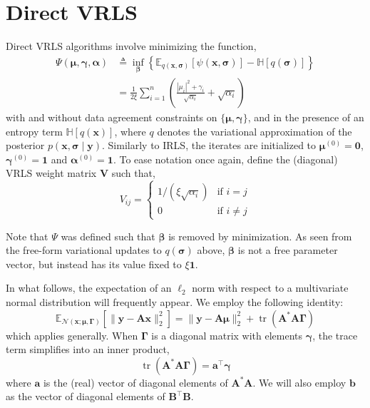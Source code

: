 \documentclass{article}
\newcommand{\m}[1]{\boldsymbol{#1}}
\newcommand{\E}[2]{\mathbb{E}_{#2}\left[ #1 \right]}
\newcommand{\entropy}[1]{\mathbb{H}\left[ #1 \right]}
\DeclareMathOperator{\trace}{tr}
\begin{document}
\section{Direct VRLS}
\label{s:vrls}
Direct VRLS algorithms involve minimizing the function,
\begin{equation}
\begin{aligned}
\Psi(\m{\mu}, \m{\gamma}, \m{\alpha}) &\triangleq
 \inf_{\m{\beta}} \left\{
  \E{\psi(\m{x}, \m{\sigma})}{q(\m{x}, \m{\sigma})} -
  \entropy{q(\m{\sigma})}
 \right\}
\\ &=
 \frac{1}{2 \xi} \sum_{i=1}^n \left(
  \frac{|\mu_i|^2 + \gamma_i}{\sqrt{\alpha_i}} + \sqrt{\alpha_i}
 \right)
\end{aligned}
\label{eq:psibar}
\end{equation}
with and without data agreement constraints on $\{\m{\mu}, \m{\gamma}\}$,
and in the presence of an entropy term $\entropy{q(\m{x})}$, where $q$
denotes the variational approximation of the posterior
$p(\m{x}, \m{\sigma} \mid \m{y})$. Similarly to IRLS, the iterates are
initialized to $\m{\mu}^{(0)} = \m{0}$, $\m{\gamma}^{(0)} = \m{1}$ and
$\m{\alpha}^{(0)} = \m{1}$. To ease notation once again, define
the (diagonal) VRLS weight matrix $\m{V}$ such that,
\begin{equation}
V_{ij} = \begin{cases}
 1/(\xi \sqrt{\alpha_i}) &\text{if } i = j \\
 0 &\text{if } i \ne j
\end{cases}
\label{eq:vmatrix}
\end{equation}

Note that $\Psi$ was defined such that $\m{\beta}$ is removed by
minimization. As seen from the free-form variational updates to
$q(\m{\sigma})$ above, $\m{\beta}$ is not a free parameter vector,
but instead has its value fixed to $\xi \m{1}$.

In what follows, the expectation of an $\ell_2$ norm with respect to
a multivariate normal distribution will frequently appear. We employ
the following identity:
\begin{equation}
\E{\| \m{y} - \m{A} \m{x} \|_2^2}
  {\mathcal{N}(\m{x}; \m{\mu}, \m{\Gamma})} =
\| \m{y} - \m{A} \m{\mu} \|_2^2 + \trace(\m{A}^* \m{A} \m{\Gamma})
\label{eq:l2expect}
\end{equation}
which applies generally. When $\m{\Gamma}$ is a diagonal matrix with
elements $\m{\gamma}$, the trace term simplifies into an inner product,
\begin{equation}
\trace(\m{A}^* \m{A} \m{\Gamma}) = \m{a}^\top \m{\gamma}
\label{eq:diag_trace}
\end{equation}
where $\m{a}$ is the (real) vector of diagonal elements of $\m{A}^* \m{A}$.
We will also employ $\m{b}$ as the vector of diagonal elements of
$\m{B}^\top \m{B}$.
\end{document}
